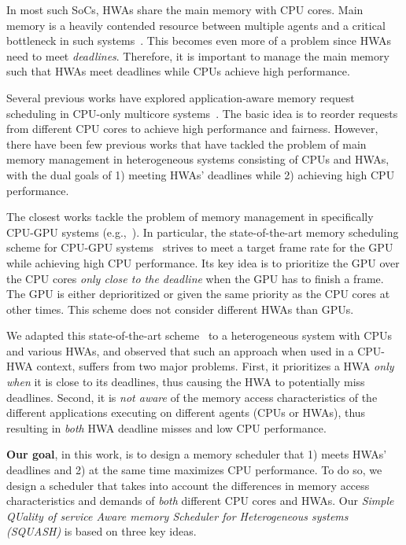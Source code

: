 \documentclass[10pt,letterpaper]{article}
\begin{document}
In most such SoCs, HWAs share the main memory with CPU cores. Main
memory is a heavily contended resource between multiple agents and
a critical bottleneck in such systems~\cite{snapdragon,visconti2}.
This becomes even more of a
problem since HWAs need to meet \emph{deadlines}. Therefore, it is
important to manage the main memory such that HWAs meet deadlines
while CPUs achieve high performance.

Several previous works have explored application-aware memory
request scheduling in CPU-only multicore systems~\cite{stfm,fqm,parbs,atlas,tcm,blist}.
The basic idea is to reorder requests from different CPU cores
to achieve high performance and
fairness. However, there have been few previous works that have tackled the problem of
main memory management in heterogeneous systems consisting of CPUs and HWAs, with the
dual goals of 1) meeting HWAs' deadlines while 2) achieving high CPU performance.

The closest works tackle the problem of memory management in specifically CPU-GPU systems
(e.g.,~\cite{schedulingCPUGPU,sms}). In particular, the state-of-the-art memory
scheduling scheme for CPU-GPU systems~\cite{schedulingCPUGPU} strives to meet a
target frame rate for the GPU while achieving high CPU performance. Its key idea
is to prioritize the GPU over the CPU cores \emph{only close to the deadline}
when the GPU has to finish a frame. The GPU is either deprioritized or given
the same priority as the CPU cores at other times. This scheme does not 
consider different HWAs than GPUs.

We adapted this state-of-the-art scheme~\cite{schedulingCPUGPU} to a
heterogeneous system with CPUs and various HWAs, and observed that such an approach when
used in a CPU-HWA context, suffers from two major problems. First, it
prioritizes a HWA \emph{only when} it is close to its deadlines, thus causing
the HWA to potentially miss deadlines. Second, it is \emph{not aware} of the
memory access characteristics of the different applications executing on
different agents (CPUs or HWAs), thus resulting in \emph{both} HWA deadline misses and low
CPU performance.

\textbf{Our goal}, in this work, is to design a memory scheduler that 1) meets
HWAs' deadlines and 2) at the same time maximizes CPU performance. To do so, we
design a scheduler that takes into account the differences in memory access
characteristics and demands of \emph{both} different CPU cores and HWAs.  Our
\emph{Simple QUality of service Aware memory Scheduler for Heterogeneous systems
(SQUASH)} is based on three key ideas.
\end{document}

